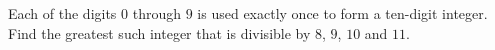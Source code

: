 Each of the digits $0$ through $9$ is used exactly once to form a ten-digit integer. Find the greatest such integer that is divisible by $8$, $9$, $10$ and $11$.
